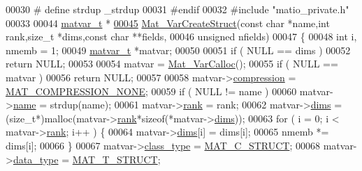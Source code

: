 \begin{DoxyCode}
00030 \textcolor{preprocessor}{#   define strdup \_strdup}
00031 \textcolor{preprocessor}{#endif}
00032 \textcolor{preprocessor}{#include "matio\_private.h"}
00033 
00044 \hyperlink{group___m_a_t_structmatvar__t}{matvar\_t} *
\hyperlink{group___m_a_t_gacecdb682a50977e54ecbdc54ed5c31bf}{00045} \hyperlink{group___m_a_t_gacecdb682a50977e54ecbdc54ed5c31bf}{Mat\_VarCreateStruct}(\textcolor{keyword}{const} \textcolor{keywordtype}{char} *name,\textcolor{keywordtype}{int} rank,\textcolor{keywordtype}{size\_t} *dims,\textcolor{keyword}{const} \textcolor{keywordtype}{char} **fields,
00046     \textcolor{keywordtype}{unsigned} nfields)
00047 \{
00048     \textcolor{keywordtype}{int} i, nmemb = 1;
00049     \hyperlink{group___m_a_t_structmatvar__t}{matvar\_t} *matvar;
00050 
00051     \textcolor{keywordflow}{if} ( NULL == dims )
00052         \textcolor{keywordflow}{return} NULL;
00053 
00054     matvar = \hyperlink{group___m_a_t_gae7c9c3699f6e9c31a9c490300013098c}{Mat\_VarCalloc}();
00055     \textcolor{keywordflow}{if} ( NULL == matvar )
00056         \textcolor{keywordflow}{return} NULL;
00057 
00058     matvar->\hyperlink{group___m_a_t_aeef0466048621cb2c959ba7f6c774d06}{compression} = \hyperlink{group___m_a_t_gga768c318af97bd2567758ecb001ceb7f4a2280b97631ff5dd24dec55261dc587b6}{MAT\_COMPRESSION\_NONE};
00059     \textcolor{keywordflow}{if} ( NULL != name )
00060         matvar->\hyperlink{group___m_a_t_a5d4b55b041e3b4fb50c04337f05ad909}{name} = strdup(name);
00061     matvar->\hyperlink{group___m_a_t_a84ba70c96ded13cc555fa75b768d9921}{rank} = rank;
00062     matvar->\hyperlink{group___m_a_t_a8e01234e1c862ce3472bb37f5a09b92c}{dims} = (\textcolor{keywordtype}{size\_t}*)malloc(matvar->\hyperlink{group___m_a_t_a84ba70c96ded13cc555fa75b768d9921}{rank}*\textcolor{keyword}{sizeof}(*matvar->\hyperlink{group___m_a_t_a8e01234e1c862ce3472bb37f5a09b92c}{dims}));
00063     \textcolor{keywordflow}{for} ( i = 0; i < matvar->\hyperlink{group___m_a_t_a84ba70c96ded13cc555fa75b768d9921}{rank}; i++ ) \{
00064         matvar->\hyperlink{group___m_a_t_a8e01234e1c862ce3472bb37f5a09b92c}{dims}[i] = dims[i];
00065         nmemb *= dims[i];
00066     \}
00067     matvar->\hyperlink{group___m_a_t_aff13035bf3265dd7d9425e5d40c839d4}{class\_type} = \hyperlink{group___m_a_t_ggad4d60ae7b709fc81bfd744fb4c857c40acb467c7749c80902b798134c729bb521}{MAT\_C\_STRUCT};
00068     matvar->\hyperlink{group___m_a_t_ab6aafe9bd77f0f077852593dec438144}{data\_type}  = \hyperlink{group___m_a_t_ggacf7b3b879282b7ab3a51190e49bf3453a4f4d5a6e1d42c6aa81ffb810e5da5c85}{MAT\_T\_STRUCT};

\end{DoxyCode}
